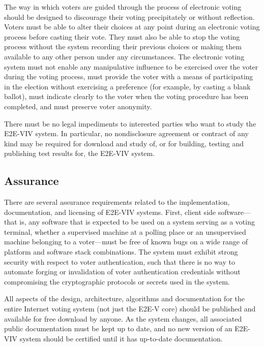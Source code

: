 The way in which voters are guided through the process of electronic
voting should be designed to discourage their voting precipitately or
without reflection. Voters must be able to alter their choices at any
point during an electronic voting process before casting their
vote. They must also be able to stop the voting process without the
system recording their previous choices or making them available to
any other person under any circumstances. The electronic voting system
must not enable any manipulative influence to be exercised over the
voter during the voting process, must provide the voter with a means
of participating in the election without exercising a preference (for
example, by casting a blank ballot), must indicate clearly to the
voter when the voting procedure has been completed, and must preserve
voter anonymity.

There must be no legal impediments to interested parties who want to
study the E2E-VIV system. In particular, no nondisclosure agreement or
contract of any kind may be required for download and study of, or for
building, testing and publishing test results for, the E2E-VIV system.

\subsection{Assurance}

There are several assurance requirements related to the
implementation, documentation, and licensing of E2E-VIV
systems. First, client side software---that is, any software that is
expected to be used on a system serving as a voting terminal, whether
a supervised machine at a polling place or an unsupervised machine
belonging to a voter---must be free of known bugs on a wide range of
platform and software stack combinations. The system must exhibit
strong security with respect to voter authentication, such that there
is no way to automate forging or invalidation of voter authentication
credentials without compromising the cryptographic protocols or
secrets used in the system.

All aspects of the design, architecture, algorithms and documentation
for the entire Internet voting system (not just the E2E-V core) should
be published and available for free download by anyone. As the system
changes, all associated public documentation must be kept up to date,
and no new version of an E2E-VIV system should be certified until it
has up-to-date documentation.

